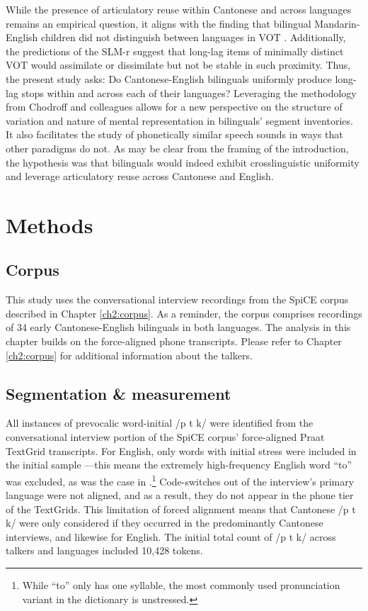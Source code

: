 While the presence of articulatory reuse within Cantonese and across languages remains an empirical question, it aligns with the finding that bilingual Mandarin-English children did not distinguish between languages in VOT \citep{yang_2019_vot}. Additionally, the predictions of the SLM-r \citep{flege_2021_slmr} suggest that long-lag items of minimally distinct VOT would assimilate or dissimilate but not be stable in such proximity. Thus, the present study asks: Do Cantonese-English bilinguals uniformly produce long-lag stops within and across each of their languages? Leveraging the methodology from Chodroff and colleagues \citep{chodroff_2017_structure, chodroff_2018_predictability, chodroff_2019_l2} allows for a new perspective on the structure of variation and nature of mental representation in bilinguals' segment inventories. It also facilitates the study of phonetically similar speech sounds in ways that other paradigms do not. As may be clear from the framing of the introduction, the hypothesis was that bilinguals would indeed exhibit crosslinguistic uniformity and leverage articulatory reuse across Cantonese and English.

\section{Methods}

\subsection{Corpus}

This study uses the conversational interview recordings from the SpiCE corpus described in Chapter \ref{ch2:corpus}. As a reminder, the corpus comprises recordings of 34 early Cantonese-English bilinguals in both languages. The analysis in this chapter builds on the force-aligned phone transcripts. Please refer to Chapter \ref{ch2:corpus} for additional information about the talkers. 

\subsection{Segmentation \& measurement}

All instances of prevocalic word-initial /p t k/ were identified from the conversational interview portion of the SpiCE corpus' force-aligned Praat TextGrid transcripts. For English, only words with initial stress were included in the initial sample \citep{lisker_1967_some}---this means the extremely high-frequency English word ``to'' was excluded, as was the case in \citet{chodroff_2017_structure}.\footnote{While ``to'' only has one syllable, the most commonly used pronunciation variant in the dictionary is unstressed.} Code-switches out of the interview's primary language were not aligned, and as a result, they do not appear in the phone tier of the TextGrids. This limitation of forced alignment means that Cantonese /p t k/ were only considered if they occurred in the predominantly Cantonese interviews, and likewise for English. The initial total count of /p t k/ across talkers and languages included 10,428 tokens. 

